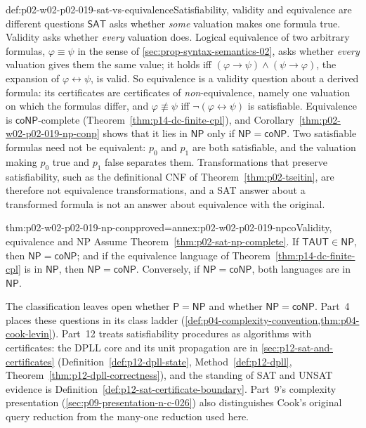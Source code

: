 \begin{hbwarning}{def:p02-w02-p02-019-sat-vs-equivalence}{Satisfiability, validity and equivalence are different questions}
\(\mathsf{SAT}\) asks whether \emph{some} valuation makes one formula true.
Validity asks whether \emph{every} valuation does.  Logical equivalence of two
arbitrary formulas, \(\varphi\equiv\psi\) in the sense of
\cref{sec:prop-syntax-semantics-02}, asks whether \emph{every} valuation gives
them the same value; it holds iff
\((\varphi\to\psi)\land(\psi\to\varphi)\), the expansion of
\(\varphi\leftrightarrow\psi\), is valid.  So equivalence is a validity
question about a derived formula: its certificates are certificates of
\emph{non}-equivalence, namely one valuation on which the formulas differ, and
\(\varphi\not\equiv\psi\) iff \(\neg(\varphi\leftrightarrow\psi)\) is
satisfiable.  Equivalence is \(\mathsf{coNP}\)-complete
(Theorem~\ref{thm:p14-dc-finite-cpl}), and
Corollary~\ref{thm:p02-w02-p02-019-np-conp} shows that it lies in
\(\mathsf{NP}\) only if \(\mathsf{NP}=\mathsf{coNP}\).
Two satisfiable formulas need not be equivalent: \(p_0\) and \(p_1\) are both
satisfiable, and the valuation making \(p_0\) true and \(p_1\) false
separates them.  Transformations that preserve satisfiability, such as the
definitional CNF of Theorem~\ref{thm:p02-tseitin}, are therefore not
equivalence transformations, and a SAT answer about a transformed formula is
not an answer about equivalence with the original.
\end{hbwarning}

\begin{hbcorollary}{thm:p02-w02-p02-019-np-conp}{proved=annex:p02-w02-p02-019-npco}{Validity, equivalence and NP}
Assume Theorem~\ref{thm:p02-sat-np-complete}.  If \(\mathsf{TAUT}\in\mathsf{NP}\),
then \(\mathsf{NP}=\mathsf{coNP}\); and if the equivalence language of
Theorem~\ref{thm:p14-dc-finite-cpl} is in \(\mathsf{NP}\), then
\(\mathsf{NP}=\mathsf{coNP}\).  Conversely, if \(\mathsf{NP}=\mathsf{coNP}\),
both languages are in \(\mathsf{NP}\).
\end{hbcorollary}

The classification leaves open whether \(\mathsf P=\mathsf{NP}\) and whether
\(\mathsf{NP}=\mathsf{coNP}\).  Part~4 places these questions in its class
ladder (\cref{def:p04-complexity-convention,thm:p04-cook-levin}).  Part~12
treats satisfiability procedures as algorithms with certificates: the DPLL
core and its unit propagation are in \cref{sec:p12-sat-and-certificates}
(Definition~\ref{def:p12-dpll-state}, Method~\ref{def:p12-dpll},
Theorem~\ref{thm:p12-dpll-correctness}), and the standing of SAT and UNSAT
evidence is Definition~\ref{def:p12-sat-certificate-boundary}.  Part~9's
complexity presentation (\cref{sec:p09-presentation-n-c-026}) also
distinguishes Cook's original query reduction from the many-one reduction used
here.


